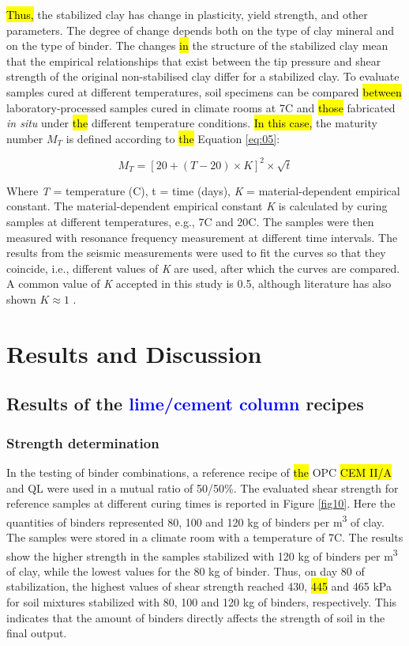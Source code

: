 \documentclass[final,3p,times,onecolumn,authoryear]{elsarticle}
\begin{document}
\hl{Thus,} the stabilized clay has change in plasticity, yield strength, and other parameters. The degree of change depends both on the type of clay mineral and on the type of binder. The changes \hl{in} the structure of the stabilized clay mean that the empirical relationships that exist between the tip pressure and shear strength of the original non-stabilised clay differ for a stabilized clay. To evaluate samples cured at different temperatures, soil specimens can be compared \hl{between} laboratory-processed samples cured in climate rooms at 7\textdegree C and \hl{those} fabricated \emph{in situ} under \hl{the }different temperature conditions. \hl{In this case, }the maturity number $M_T$ is defined according to \hl{the }Equation \ref{eq:05}: 

\begin{equation}\label{eq:05}
	M_T =[ 20+(T-20)\times K]^2 \times \sqrt{t}
\end{equation}

Where \emph{T} = temperature (\textdegree C), t = time (days), \emph{K} = material-dependent empirical constant.
The material-dependent empirical constant \emph{K} is calculated by curing samples at different temperatures, e.g., 7\textdegree C and 20\textdegree C. The samples were then measured with resonance frequency measurement at different time intervals. The results from the seismic measurements were used to fit the curves so that they coincide, i.e., different values of \emph{K} are used, after which the curves are compared. A common value of \emph{K} accepted in this study is 0.5, although literature has also shown $K \approx 1$ \citep{Ahnberg}.

\section{Results and Discussion}
\subsection{Results of the \textcolor{blue}{lime/cement column} recipes}
\subsubsection{Strength determination}

In the testing of binder combinations, a reference recipe of \hl{the }OPC \hl{CEM II/A} and QL were used in a mutual ratio of 50/50\%. The evaluated shear strength for reference samples at different curing times is reported in Figure \ref{fig10}. Here the quantities of binders represented 80, 100 and 120 kg of binders per m\textsuperscript{3} of clay. The samples were stored in a climate room with a temperature of 7\textdegree C. The results show the higher strength in the samples stabilized with 120 kg of binders per m\textsuperscript{3} of clay, while the lowest values for the 80 kg of binder. Thus, on day 80 of stabilization, the highest values of shear strength reached 430, \hl{445} and 465 kPa for soil mixtures stabilized with 80, 100 and 120 kg of binders, respectively. This indicates that the amount of binders directly affects the strength of soil in the final output. 
\end{document}
